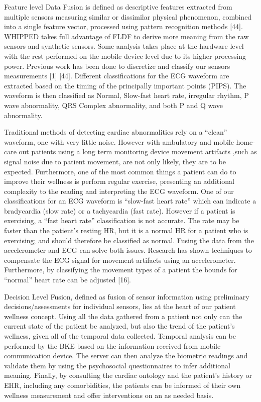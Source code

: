 Feature level Data Fusion is defined as descriptive features extracted from multiple sensors measuring similar or dissimilar physical phenomenon, combined into a single feature vector,  processed using pattern recognition methods [44]. WHIPPED takes full advantage of FLDF to derive more meaning from the raw sensors and synthetic sensors. Some analysis takes place at the hardware level with the rest performed on the mobile device level due to its higher processing power. Previous work has been done to discretize and classify our sensors measurements [1] [44]. Different classifications for the ECG waveform are extracted based on the timing of the principally important points (PIPS).  The waveform is then classified as Normal, Slow-fast heart rate, irregular rhythm, P wave abnormality, QRS Complex abnormality, and both P and Q wave abnormality. 

Traditional methods of detecting cardiac abnormalities rely on a “clean” waveform, one with very little noise. However with ambulatory and mobile home-care out patients using a long term monitoring device movement artifacts ,such as signal noise due to patient movement, are not only likely, they are to be expected. Furthermore, one of the most common things a patient can do to improve their wellness is perform regular exercise, presenting an additional complexity to the reading and interpreting the ECG waveform. One of our classifications for an ECG waveform is “slow-fast heart rate” which can indicate a bradycardia (slow rate) or a tachycardia (fast rate). However if a patient is exercising, a “fast heart rate” classification is not accurate. The rate may be faster than the patient’s resting HR, but it is a normal HR for a patient who is exercising; and should therefore be classified as normal. Fusing the data from the accelerometer and ECG can solve both issues. Research has shown techniques to compensate the ECG signal for movement artifacts using an accelerometer. Furthermore, by classifying the movement types of a patient the bounds for “normal” heart rate can be adjusted [16].

Decision Level Fusion, defined as fusion of sensor information using preliminary decisions/assessments for individual sensors, lies at the heart of our patient wellness concept. Using all the data gathered from a patient not only can the current state of the patient be analyzed, but also the trend of the patient’s wellness, given all of the temporal data collected. Temporal analysis can be performed by the BKE based on the information received from mobile communication device. The server can then analyze the biometric readings and validate them by using the psychosocial questionnaires to infer additional meaning. Finally, by consulting the cardiac ontology and the patient’s history or EHR, including any comorbidities, the patients can be informed of their own wellness measurement and offer interventions on an as needed basis. 

